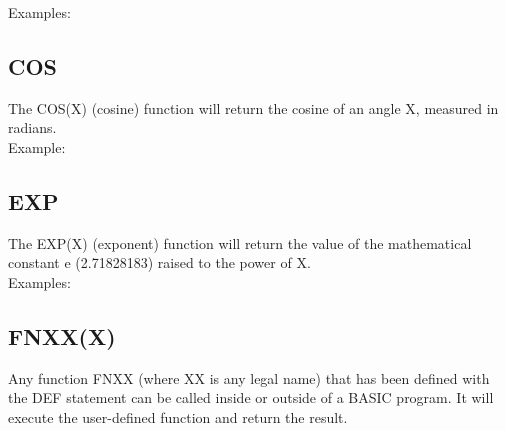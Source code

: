 Examples:\\


\subsection{COS}

The {\ttfamily COS(X)} (cosine) function will return the cosine of an angle
{\ttfamily X}, measured in radians.\\

Example:\\


\subsection{EXP}

The {\ttfamily EXP(X)} (exponent) function will return the value of the
mathematical constant {\ttfamily e} (2.71828183) raised to the power of
{\ttfamily X}.\\

Examples:\\


\subsection{FNXX(X)}

Any function {\ttfamily FNXX} (where {\ttfamily XX} is any legal name) that has
been defined with the {\ttfamily DEF} statement can be called inside or outside
of a BASIC program.  It will execute the user-defined function and return the
result.\\

